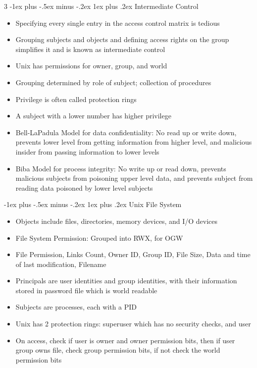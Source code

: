 \documentclass[10pt, landscape]{article}
\makeatletter
\renewcommand{\subsection}{\@startsection{subsection}{3}{0mm}%
                                {-1ex plus -.5ex minus -.2ex}%
                                {1ex plus .2ex}%
                                {\normalfont\small\bfseries}}%
\makeatother
\begin{document}
\begin{multicols*}{3}
\subsection{Intermediate Control}
\begin{itemize}
    \item Specifying every single entry in the access control matrix is tedious
    \item Grouping subjects and objects and defining access rights on the group simplifies it and is known as intermediate control
    \item Unix has permissions for owner, group, and world
    \item Grouping determined by role of subject; collection of procedures
    \item Privilege is often called protection rings
    \item A subject with a lower number has higher privilege
    \item Bell-LaPadula Model for data confidentiality: No read up or write down, prevents lower level from getting information from higher level, and malicious insider from passing information to lower levels
    \item Biba Model for process integrity: No write up or read down, prevents malicious subjects from poisoning upper level data, and prevents subject from reading data poisoned by lower level subjects
\end{itemize}

\subsection{Unix File System}
\begin{itemize}
    \item Objects include files, directories, memory devices, and I/O devices
    \item File System Permission: Grouped into RWX, for OGW
    \item File Permission, Links Count, Owner ID, Group ID, File Size, Data and time of last modification, Filename
    \item Principals are user identities and group identities, with their information stored in password file which is world readable
    \item Subjects are processes, each with a PID
    \item Unix has 2 protection rings: superuser which has no security checks, and user
    \item On access, check if user is owner and owner permission bits, then if user group owns file, check group permission bits, if not check the world permission bits
\end{itemize}


\end{multicols*}
\end{document}
